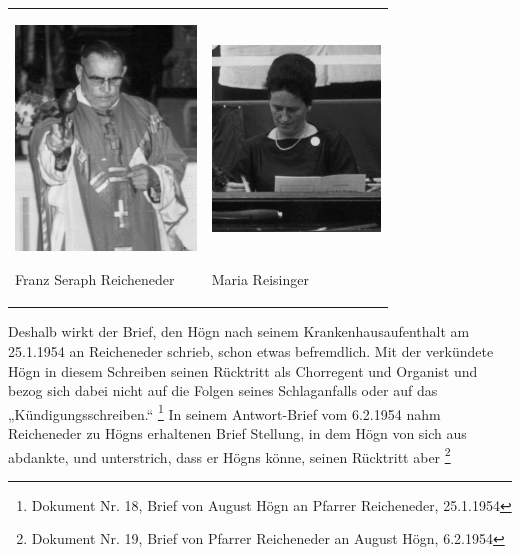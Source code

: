 \begin{center}
\begin{minipage}{10.084cm}
\begin{flushleft}
\tablefirsthead{}
\tablehead{}
\tabletail{}
\tablelasttail{}
\begin{supertabular}{m{5.018cm}m{4.6670003cm}}

\includegraphics[width=4.835cm,height=5.992cm]{pictures/zulassungsarbeit-img051.jpg}

Franz Seraph Reicheneder &

\includegraphics[width=4.484cm,height=6.003cm]{pictures/zulassungsarbeit-img052.jpg}

Maria Reisinger\\
\end{supertabular}
\end{flushleft}
\end{minipage}
\end{center}
Deshalb wirkt der Brief, den Högn nach seinem Krankenhausaufenthalt am
25.1.1954 an Reicheneder schrieb, schon etwas befremdlich. Mit der
 verkündete Högn in diesem Schreiben seinen
Rücktritt als Chorregent und Organist und bezog sich dabei nicht auf
die Folgen seines Schlaganfalls oder auf das „Kündigungsschreiben.“
 \footnote{Dokument Nr. 18, Brief von August Högn an Pfarrer
Reicheneder, 25.1.1954} In seinem Antwort-Brief vom 6.2.1954 nahm
Reicheneder zu Högns erhaltenen Brief Stellung, in dem Högn von sich
aus abdankte, und unterstrich, dass er Högns
 könne, seinen
Rücktritt aber  \footnote{Dokument
Nr. 19, Brief von Pfarrer Reicheneder an August Högn, 6.2.1954}

